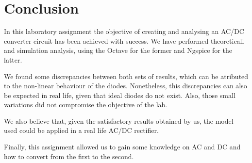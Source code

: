 \section{Conclusion}
\label{sec:conclusion}

In this laboratory assignment the objective of creating and analysing an AC/DC converter circuit has been achieved with success. 
We have performed theoreticall and simulation analysis, using the Octave for the former and Ngspice for the latter.

We found some discrepancies between both sets of results, which can be atributed to the non-linear behaviour of the diodes. Nonetheless, this discrepancies can also be expected in real life,
given that ideal diodes do not exist. Also, those small variations did not compromise the objective of the lab.

We also believe that, given the satisfactory results obtained by us, the model used could be applied in a real life AC/DC rectifier.

Finally, this assignment allowed us to gain some knowledge on AC and DC and how to convert from the first to the second.







